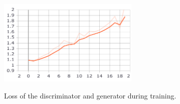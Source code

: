 \begin{figure}[htbp]
	\begin{minipage}{0.8\textwidth}
	\centering
	\includegraphics[width=0.6\textwidth]{Sources/Results/no_pooling/plots_pdf/epoch_loss.pdf}
	\label{fig:1d}
	\end{minipage}
	
	\caption{Loss of the discriminator and generator during training.} \label{fig:1}
\end{figure}

